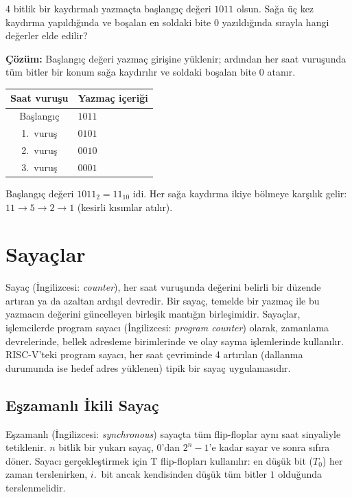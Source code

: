 \begin{ornek}[B.14]
4 bitlik bir kaydırmalı yazmaçta başlangıç değeri $1011$ olsun. Sağa üç kez kaydırma yapıldığında ve boşalan en soldaki bite 0 yazıldığında sırayla hangi değerler elde edilir?

\textbf{Çözüm:}
Başlangıç değeri yazmaç girişine yüklenir; ardından her saat vuruşunda tüm bitler bir konum sağa kaydırılır ve soldaki boşalan bite 0 atanır.

\begin{table}[H]
\centering
\begin{tabular}{cl}
\toprule
\textbf{Saat vuruşu} & \textbf{Yazmaç içeriği} \\
\midrule
Başlangıç & $1011$ \\
1.~vuruş   & $0101$ \\
2.~vuruş   & $0010$ \\
3.~vuruş   & $0001$ \\
\bottomrule
\end{tabular}
\end{table}

Başlangıç değeri $1011_2 = 11_{10}$ idi. Her sağa kaydırma ikiye bölmeye karşılık gelir: $11 \to 5 \to 2 \to 1$ (kesirli kısımlar atılır).
\end{ornek}


\section{Sayaçlar}
\label{sec:sayaclar}

Sayaç (İngilizcesi: \textit{counter}), her saat vuruşunda değerini belirli bir düzende artıran ya da azaltan ardışıl devredir. Bir sayaç, temelde bir yazmaç ile bu yazmacın değerini güncelleyen birleşik mantığın birleşimidir. Sayaçlar, işlemcilerde program sayacı (İngilizcesi: \textit{program counter}) olarak, zamanlama devrelerinde, bellek adresleme birimlerinde ve olay sayma işlemlerinde kullanılır. RISC-V'teki program sayacı, her saat çevriminde 4 artırılan (dallanma durumunda ise hedef adres yüklenen) tipik bir sayaç uygulamasıdır.

\subsection{Eşzamanlı İkili Sayaç}

Eşzamanlı (İngilizcesi: \textit{synchronous}) sayaçta tüm flip-floplar aynı saat sinyaliyle tetiklenir. $n$ bitlik bir yukarı sayaç, $0$'dan $2^n - 1$'e kadar sayar ve sonra sıfıra döner. Sayacı gerçekleştirmek için T flip-flopları kullanılır: en düşük bit ($T_0$) her zaman terslenirken, $i$.~bit ancak kendisinden düşük tüm bitler $1$ olduğunda terslenmelidir.

